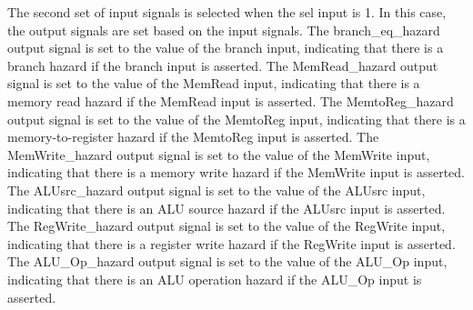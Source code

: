 \documentclass{article}
\begin{document}
The second set of input signals is selected when the sel input is 1. In this case, the output signals are set based on the input signals. The branch\_eq\_hazard output signal is set to the value of the branch input, indicating that there is a branch hazard if the branch input is asserted. The MemRead\_hazard output signal is set to the value of the MemRead input, indicating that there is a memory read hazard if the MemRead input is asserted. The MemtoReg\_hazard output signal is set to the value of the MemtoReg input, indicating that there is a memory-to-register hazard if the MemtoReg input is asserted. The MemWrite\_hazard output signal is set to the value of the MemWrite input, indicating that there is a memory write hazard if the MemWrite input is asserted. The ALUsrc\_hazard output signal is set to the value of the ALUsrc input, indicating that there is an ALU source hazard if the ALUsrc input is asserted. The RegWrite\_hazard output signal is set to the value of the RegWrite input, indicating that there is a register write hazard if the RegWrite input is asserted. The ALU\_Op\_hazard output signal is set to the value of the ALU\_Op input, indicating that there is an ALU operation hazard if the ALU\_Op input is asserted.
\end{document}

